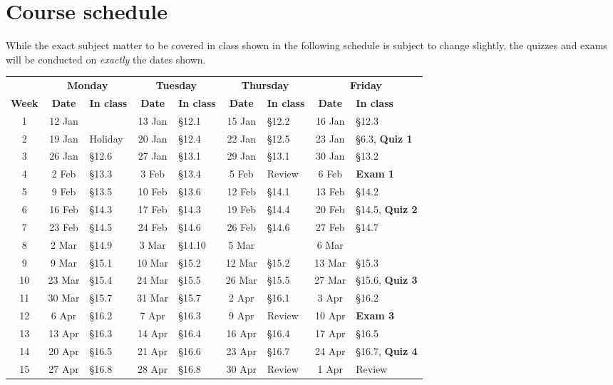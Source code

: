 \documentclass[11pt]{article}
\begin{document}
\section{Course schedule}\label{Schedule} While the exact subject
matter to be covered in class shown in the following schedule is
subject to change slightly, the quizzes and exams will be conducted
on {\em exactly} the dates shown.

\begin{tabular}{c|cl|cl|cl|cl}
&\multicolumn{2}{c|}{\bf Monday}
&\multicolumn{2}{c|}{\bf Tuesday}
&\multicolumn{2}{c|}{\bf Thursday}
&\multicolumn{2}{c}{\bf Friday}\\
{\bf Week}&{\bf Date}&{\bf In class}
&{\bf Date}&{\bf In class}&{\bf Date}&{\bf In class}
&{\bf Date}&{\bf In class}\\\toprule
1&12 Jan&&13 Jan&\S12.1&15 Jan&\S12.2&16 Jan&\S12.3\\\midrule
2&19 Jan&Holiday&20 Jan&\S12.4&22 Jan&\S12.5&23 Jan&\S6.3, {\bf Quiz 1}\\\midrule
3&26 Jan&\S12.6&27 Jan&\S13.1&29 Jan&\S13.1&30 Jan&\S13.2\\\midrule
4&2 Feb&\S13.3&3 Feb&\S13.4&5 Feb&Review&6 Feb&{\bf Exam 1}\\\midrule
5&9 Feb&\S13.5&10 Feb&\S13.6&12 Feb&\S14.1&13 Feb&\S14.2\\\midrule
6&16 Feb&\S14.3&17 Feb&\S14.3&19 Feb&\S14.4&20 Feb&\S14.5, {\bf Quiz 2}\\\midrule
7&23 Feb&\S14.5&24 Feb&\S14.6&26 Feb&\S14.6&27 Feb&\S14.7\\\midrule
8&2 Mar&\S14.9&3 Mar&\S14.10&5 Mar&&6 Mar&\\\midrule
9&9 Mar&\S15.1&10 Mar&\S15.2&12 Mar&\S15.2&13 Mar&\S15.3 \\\midrule
10&23 Mar&\S15.4&24 Mar&\S15.5&26 Mar&\S15.5&27 Mar&\S15.6, {\bf Quiz 3}\\\midrule
11&30 Mar&\S15.7&31 Mar&\S15.7&2 Apr&\S16.1&3 Apr&\S16.2\\\midrule
12&6 Apr&\S16.2&7 Apr&\S16.3&9 Apr&Review&10 Apr&{\bf Exam 3}\\\midrule
13&13 Apr&\S16.3&14 Apr&\S16.4&16 Apr&\S16.4&17 Apr&\S16.5\\\midrule
14&20 Apr&\S16.5&21 Apr&\S16.6&23 Apr&\S16.7&24 Apr&\S16.7, {\bf Quiz 4}\\\midrule
15&27 Apr&\S16.8&28 Apr&\S16.8&30 Apr&Review&1 Apr&Review\\\midrule
\end{tabular}
\end{document}
